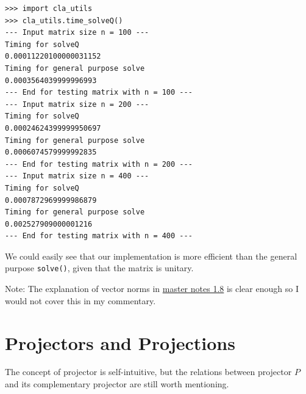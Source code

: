 \bigskip
\begin{lstlisting}
>>> import cla_utils
>>> cla_utils.time_solveQ()
--- Input matrix size n = 100 ---
Timing for solveQ
0.00011220100000031152
Timing for general purpose solve
0.0003564039999996993
--- End for testing matrix with n = 100 ---
--- Input matrix size n = 200 ---
Timing for solveQ
0.00024624399999950697
Timing for general purpose solve
0.0006074579999992835
--- End for testing matrix with n = 200 ---
--- Input matrix size n = 400 ---
Timing for solveQ
0.0007872969999986879
Timing for general purpose solve
0.002527909000001216
--- End for testing matrix with n = 400 ---
\end{lstlisting}
We could easily see that our implementation is more efficient than the general purpose \texttt{solve()}, given that the matrix is unitary.

\medskip
\noindent Note: The explanation of vector norms in \href{https://comp-lin-alg.github.io/L1_preliminaries.html#vector-norms}{master notes 1.8} is clear enough so I would not cover this in my commentary.

\section{Projectors and Projections}%
The concept of projector is self-intuitive, but the relations between projector $P$ and its complementary projector are still worth mentioning.

